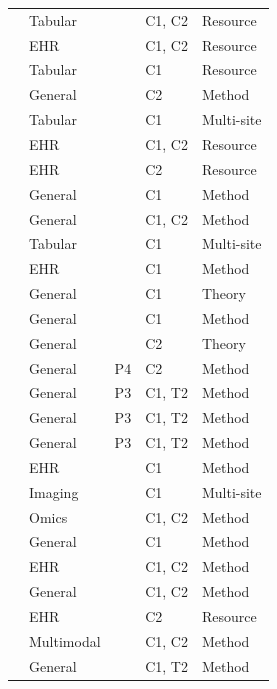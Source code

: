 {\begin{longtable}{@{}p{5.6cm}llll@{}}
\citet{gaye2014datashield} & Tabular &  & C1, C2 & Resource\\
\citet{hripcsak2015observational} & EHR &  & C1, C2 & Resource\\
\citet{lu2015webdisco} & Tabular &  & C1 & Resource\\
\citet{abadi2016deep} & General &  & C2 & Method\\
\citet{jochems2016distributed} & Tabular &  & C1 & Multi-site\\
\citet{johnson2016mimic} & EHR &  & C1, C2 & Resource\\
\citet{mandel2016smart} & EHR &  & C2 & Resource\\
\citet{blanchard2017machine} & General &  & C1 & Method\\
\citet{bonawitz2017practical} & General &  & C1, C2 & Method\\
\citet{jochems2017developing} & Tabular &  & C1 & Multi-site\\
\citet{kim2017federated} & EHR &  & C1 & Method\\
\citet{lian2017can} & General &  & C1 & Theory\\
\citet{mcmahan2017communication} & General &  & C1 & Method\\
\citet{mironov2017renyi} & General &  & C2 & Theory\\
\citet{papernot2017semi} & General & P4 & C2 & Method\\
\citet{smith2017federated} & General & P3 & C1, T2 & Method\\
\citet{vanhaesebrouck2017decentralized} & General & P3 & C1, T2 & Method\\
\citet{bellet2018personalized} & General & P3 & C1, T2 & Method\\
\citet{brisimi2018federated} & EHR &  & C1 & Method\\
\citet{chang2018distributed} & Imaging &  & C1 & Multi-site\\
\citet{cho2018secure} & Omics &  & C1, C2 & Method\\
\citet{gupta2018distributed} & General &  & C1 & Method\\
\citet{lee2018privacy} & EHR &  & C1, C2 & Method\\
\citet{mcmahan2018learning} & General &  & C1, C2 & Method\\
\citet{reps2018design} & EHR &  & C2 & Resource\\
\citet{vepakomma2018split} & Multimodal &  & C1, C2 & Method\\
\citet{zhao2018federated} & General &  & C1, T2 & Method\\

\end{longtable}}
